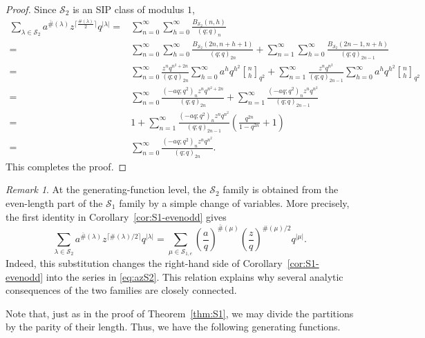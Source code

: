 \documentclass[11pt]{amsart}
\theoremstyle{definition}
\theoremstyle{remark}
\newtheorem{remark}[theorem]{Remark}
\numberwithin{equation}{section}
\begin{document}
\begin{proof}
Since $\mathcal{S}_2$ is an SIP class of modulus $1$,
\begin{align*}
\sum_{\lambda\in\mathcal{S}_2}a^{\overline{\#}(\lambda)}z^{\lceil\frac{\#(\lambda)}{2}\rceil}q^{|\lambda|}=&\sum_{n=0}^{\infty}\sum_{h=0}^{\infty}\frac{B_{\mathcal S_2}(n,h)}{(q;q)_n}\\
=&\sum_{n=0}^{\infty}\sum_{h=0}^{\infty}\frac{B_{\mathcal S_2}(2n,n+h+1)}{(q;q)_{2n}}+\sum_{n=1}^{\infty}\sum_{h=0}^{\infty}\frac{B_{\mathcal S_2}(2n-1,n+h)}{(q;q)_{2n-1}}\\
=&\sum_{n=0}^{\infty}\frac{z^nq^{n^2+2n}}{(q;q)_{2n}}\sum_{h=0}^{\infty}a^hq^{h^2}{n\brack h}_{q^2}+\sum_{n=1}^{\infty}\frac{z^nq^{n^2}}{(q;q)_{2n-1}}\sum_{h=0}^{\infty}a^hq^{h^2}{n\brack h}_{q^2}\\
=&\sum_{n=0}^{\infty}\frac{(-aq;q^2)_{n}z^nq^{n^2+2n}}{(q;q)_{2n}}+\sum_{n=1}^{\infty}\frac{(-aq;q^2)_{n}z^nq^{n^2}}{(q;q)_{2n-1}}\\
=&1+\sum_{n=1}^{\infty}\frac{(-aq;q^2)_{n}z^nq^{n^2}}{(q;q)_{2n-1}}\left(\frac{q^{2n}}{1-q^{2n}}+1\right)\\
=&\sum_{n=0}^{\infty}\frac{(-aq;q^2)_{n}z^nq^{n^2}}{(q;q)_{2n}}.
\end{align*}
This completes the proof.
\end{proof}

\begin{remark}\label{rem:S1e-S2}
At the generating-function level, the $\mathcal S_2$ family is obtained from the even-length part of the $\mathcal S_1$ family by a simple change of variables. More precisely, the first identity in Corollary~\ref{cor:S1-evenodd} gives
\[
\sum_{\lambda\in\mathcal S_2}a^{\overline{\#}(\lambda)}z^{\lceil\#(\lambda)/2\rceil}q^{|\lambda|}
=
\sum_{\mu\in\mathcal S_{1,e}}
\left(\frac{a}{q}\right)^{\overline{\#}(\mu)}
\left(\frac{z}{q}\right)^{\#(\mu)/2}q^{|\mu|}.
\]
Indeed, this substitution changes the right-hand side of Corollary~\ref{cor:S1-evenodd} into the series in \eqref{eq:azS2}. This relation explains why several analytic consequences of the two families are closely connected.
\end{remark}

Note that, just as in the proof of Theorem~\ref{thm:S1}, we may divide the partitions by the parity of their length. Thus, we have the following generating functions.
\end{document}
